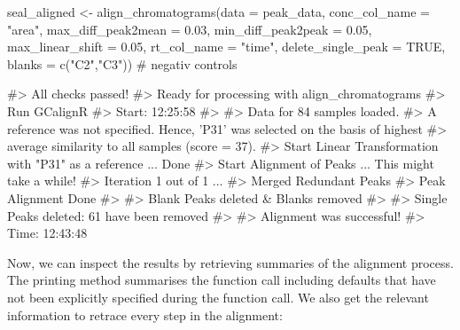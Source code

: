 \begin{Schunk}
\begin{Sinput}
seal_aligned <- align_chromatograms(data = peak_data,
                    conc_col_name = "area",
                    max_diff_peak2mean = 0.03,
                    min_diff_peak2peak = 0.05,
                    max_linear_shift = 0.05,
                    rt_col_name = "time",
                    delete_single_peak = TRUE,
                    blanks = c("C2","C3")) # negativ controls
\end{Sinput}
\begin{Soutput}
#> All checks passed!
#> Ready for processing with align_chromatograms
#> Run GCalignR
#> Start: 12:25:58
#> 
#> Data for 84 samples loaded.
#> A reference was not specified. Hence, 'P31' was selected on the basis of highest
#> average similarity to all samples (score = 37).
#> Start Linear Transformation with "P31" as a reference ... Done
#> Start Alignment of Peaks ...  This might take a while!
#> Iteration 1 out of 1  ... 
#> Merged Redundant Peaks
#> Peak Alignment Done 
#> 
#> Blank Peaks deleted & Blanks removed
#> 
#> Single Peaks deleted: 61 have been removed
#> 
#> Alignment was successful!
#> Time: 12:43:48
\end{Soutput}
\end{Schunk}

Now, we can inspect the results by retrieving summaries of the alignment
process. The printing method summarises the function call including
defaults that have not been explicitly specified during the function
call. We also get the relevant information to retrace every step in the
alignment:

